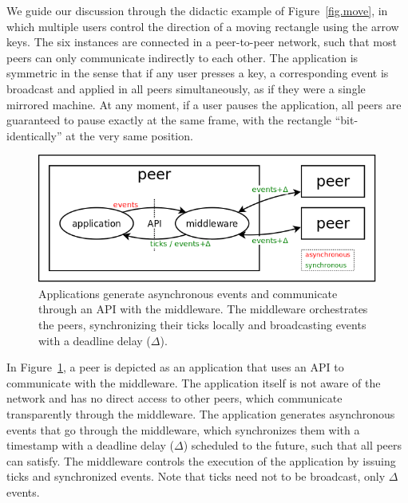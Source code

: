 \documentclass[12pt]{article}
\begin{document}
We guide our discussion through the didactic example of Figure~\ref{fig.move},
in which multiple users control the direction of a moving rectangle using the
arrow keys.
The six instances are connected in a peer-to-peer network, such that most
peers can only communicate indirectly to each other.
%
The application is symmetric in the sense that if any user presses a key, a
corresponding event is broadcast and applied in all peers simultaneously, as
if they were a single mirrored machine.
At any moment, if a user pauses the application, all peers are guaranteed to
pause exactly at the same frame, with the rectangle ``bit-identically'' at the
very same position.

\begin{figure}
  \centering
  \includegraphics[width=0.75\linewidth]{middleware}
  \caption{
    Applications generate asynchronous events and communicate through an API
    with the middleware.
    The middleware orchestrates the peers, synchronizing their ticks locally
    and broadcasting events with a deadline delay ($\Delta$).
    \label{fig.middleware}
  }
\end{figure}

In Figure~\ref{fig.middleware}, a peer is depicted as an application that uses
an API to communicate with the middleware.
The application itself is not aware of the network and has no direct access to
other peers, which communicate transparently through the middleware.
The application generates asynchronous events that go through the middleware,
which synchronizes them with a timestamp with a deadline delay ($\Delta$)
scheduled to the future, such that all peers can satisfy.
The middleware controls the execution of the application by issuing ticks and
synchronized events.
Note that ticks need not to be broadcast, only $\Delta$ events.
\end{document}
